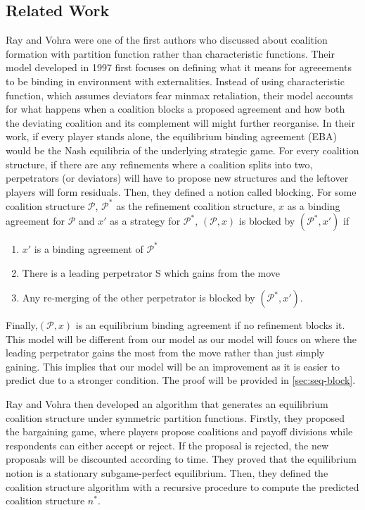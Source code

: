 \subsection*{Related Work}
Ray and Vohra were one of the first authors who discussed about coalition formation with partition function rather than characteristic functions. Their model developed in 1997 first focuses on defining what it means for agreeements to be binding in environment with externalities. Instead of using characteristic function, which assumes deviators fear minmax retaliation, their model accounts for what happens when a coalition blocks a proposed agreement and how both the deviating coalition and its complement will might further reorganise. In their work, if every player stands alone, the equilibrium binding agreement (EBA) would be the Nash equilibria of the underlying strategic game. For every coalition structure, if there are any refinements where a coalition splits into two, perpetrators (or deviators) will have to propose new structures and the leftover players will form residuals. Then, they defined a notion called blocking. For some coalition structure $\mathcal{P}$,  $\mathcal{P}^*$ as the refinement coalition structure, $x$ as a binding agreement for $\mathcal{P}$ and $x'$ as a strategy for $\mathcal{P}^*$, $(\mathcal{P}, x)$ is blocked by $(\mathcal{P}^*, x')$ if 
\begin{enumerate}
	\item $x'$ is a binding agreement of $\mathcal{P}^*$ 
	\item There is a leading perpetrator S which gains from the move 
	\item Any re-merging of the other perpetrator is blocked by $(\mathcal{P}^*, x')$.  
\end{enumerate}
Finally,$(\mathcal{P}, x)$ is an equilibrium binding agreement if no refinement blocks it. This model will be different from our model as our model will foucs on where the leading perpetrator gains the most from the move rather than just simply gaining. This implies that our model will be an improvement as it is easier to predict due to a stronger condition. The proof will be provided in \ref{sec:seq-block}. 

Ray and Vohra then developed an algorithm that generates an equilibrium coalition structure under symmetric partition functions. Firstly, they proposed the bargaining game, where players propose coalitions and payoff divisions while respondents can either accept or reject. If the proposal is rejected, the new proposals will be discounted according to time. They proved that the equilibrium notion is a stationary subgame-perfect equilibrium. Then, they defined the coalition structure algorithm with a recursive procedure to compute the predicted coalition structure $n^*$. 

